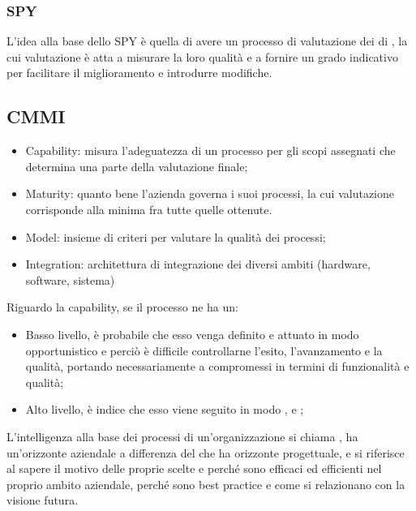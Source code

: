 \documentclass[../main]{subfiles}
\begin{document}
\subsubsection{SPY}
L'idea alla base dello SPY è quella di avere un processo di valutazione dei  di , la cui valutazione è atta a misurare la loro qualità e a fornire un grado indicativo per facilitare il miglioramento e introdurre modifiche.
\subsection{CMMI}
\begin{itemize}
    \item Capability: misura l'adeguatezza di un processo per gli scopi assegnati che determina una parte della valutazione finale;
    \item Maturity: quanto bene l'azienda governa i suoi processi, la cui valutazione corrisponde alla minima fra tutte quelle ottenute.
    \item Model: insieme di criteri per valutare la qualità dei processi;
    \item Integration: architettura di integrazione dei diversi ambiti (hardware, software, sistema)
\end{itemize}
Riguardo la capability, se il processo ne ha un:
\begin{itemize}
    \item Basso livello, è probabile che esso venga definito e attuato in modo opportunistico e perciò è difficile controllarne l'esito, l'avanzamento e la qualità, portando necessariamente a compromessi in termini di funzionalità e qualità;
    \item Alto livello, è indice che esso viene seguito in modo ,  e ;
\end{itemize}
L'intelligenza alla base dei processi di un'organizzazione si chiama , ha un'orizzonte aziendale a differenza del  che ha orizzonte progettuale, e si riferisce al sapere il motivo delle proprie scelte e perché sono efficaci ed efficienti nel proprio ambito aziendale, perché sono best practice e come si relazionano con la visione futura.
\end{document}
